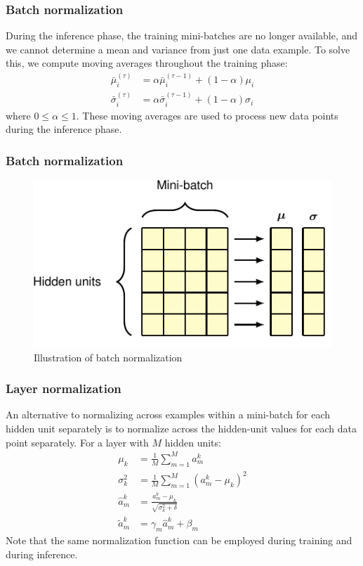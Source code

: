 \documentclass{beamer}
\begin{document}
\begin{frame}
    \frametitle{Batch normalization}
    During the inference phase, the training mini-batches are no longer available, and we cannot determine a mean and variance from just one data example. To solve this, we compute moving averages throughout the training phase:
    \begin{align*}
        \bar{\mu}^{(\tau)}_{i}&=\alpha\bar{\mu}^{(\tau-1)}_{i}+(1-\alpha)\mu_{i} \\
        \bar{\sigma}^{(\tau)}_{i}&=\alpha\bar{\sigma}^{(\tau-1)}_{i}+(1-\alpha)\sigma_{i}
    \end{align*}
    where $0\le\alpha\le{}1$. These moving averages are used to process new data points during the inference phase.
\end{frame}

\begin{frame}
    \frametitle{Batch normalization}
    \begin{figure}
        \caption{Illustration of batch normalization}
        \includegraphics{Figure_8_a.pdf}
    \end{figure}
\end{frame}

\begin{frame}
    \frametitle{Layer normalization}
    An alternative to normalizing across examples within a mini-batch for each hidden unit separately is to normalize across the hidden-unit values for each data point separately. For a layer with $M$ hidden units:
    \begin{align*}
        \mu_{k}&=\frac{1}{M}\sum_{m=1}^{M}a^{k}_{m} \\
        \sigma^{2}_{k}&=\frac{1}{M}\sum_{m=1}^{M}(a^{k}_{m}-\mu_{k})^{2} \\
        \hat{a}^{k}_{m}&=\frac{a^{k}_{m}-\mu_{k}}{\sqrt{\sigma^{2}_{k}+\delta}} \\
        \tilde{a}^{k}_{m}&=\gamma_{m}\hat{a}^{k}_{m}+\beta_{m}
    \end{align*}
    Note that the same normalization function can be employed during training and during inference.
\end{frame}
\end{document}

